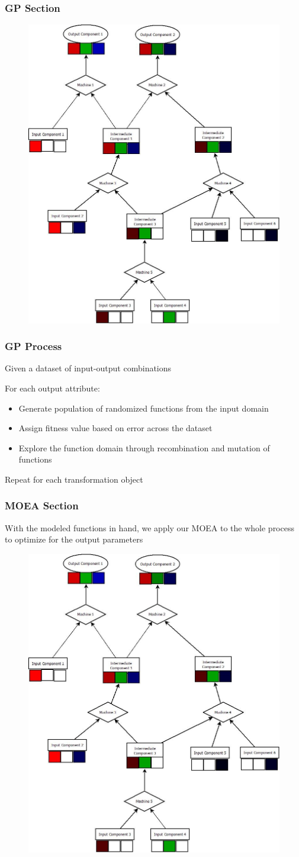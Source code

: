 \documentclass{beamer}
\begin{document}
\begin{frame}
\frametitle{GP Section}
\begin{figure}
\includegraphics[width=0.5\linewidth, trim={6cm 0 8.1cm 17.1cm},clip]{BaseModel.jpeg}
\end{figure}
\end{frame}

\begin{frame}
\frametitle{GP Process}
Given a dataset of input-output combinations

For each output attribute:
\begin{itemize}
\item Generate population of randomized functions from the input domain\pause
\item Assign fitness value based on error across the dataset\pause
\item Explore the function domain through recombination and mutation of functions
\end{itemize}
Repeat for each transformation object
\end{frame}

\begin{frame}
\frametitle{MOEA Section}
With the modeled functions in hand, we apply our MOEA to the whole process to optimize for the output parameters
\begin{figure}
\includegraphics[width=0.4\linewidth]{BaseModel.jpeg}
\end{figure}
\end{frame}
\end{document}
